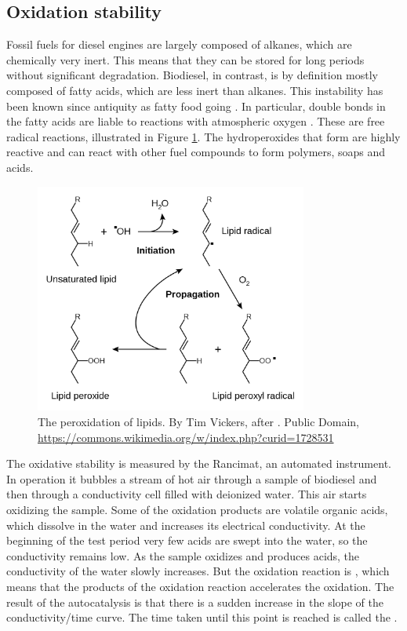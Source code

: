 \subsection{Oxidation stability}
\label{sec:Rancimat}

Fossil fuels for diesel engines are largely composed of alkanes, which are
chemically very inert. This means that they can be stored for long periods
without significant degradation. Biodiesel, in contrast, is by definition
\autocite[Paragraph 4.1.1]{SANS1935} mostly composed of fatty acids, which are
less inert than alkanes. This instability has been known since antiquity as
fatty food going . In particular, double bonds in the fatty
acids are liable to reactions with atmospheric oxygen \autocite{Velasco2010}.
These are free radical reactions, illustrated in Figure \ref{fig:RancidRadical}.
The hydroperoxides that form are highly reactive and can react with other fuel
compounds to form polymers, soaps and acids.

\begin{figure}
\centering
\includegraphics[width=0.8\textwidth]{Figures/1281px-Lipid_peroxidation.png}
\decoRule

\caption[The peroxidation of lipids.]{The peroxidation of lipids. By Tim
Vickers, after \autocite{Young2001}. Public Domain,
\url{https://commons.wikimedia.org/w/index.php?curid=1728531}}

\label{fig:RancidRadical}
\end{figure}

The oxidative stability is measured by the Rancimat, an automated instrument. In
operation it bubbles a stream of hot air through a sample of biodiesel and then
through a conductivity cell filled with deionized water. This air starts
oxidizing the sample. Some of the oxidation products are volatile organic acids,
which dissolve in the water and increases its electrical conductivity. At the
beginning of the test period very few acids are swept into the water, so the
conductivity remains low. As the sample oxidizes and produces acids, the
conductivity of the water slowly increases. But the oxidation reaction is
, which means that the products of the oxidation reaction
accelerates the oxidation. The result of the autocatalysis is that there is a
sudden increase in the slope of the conductivity/time curve. The time taken
until this point is reached is called the .

